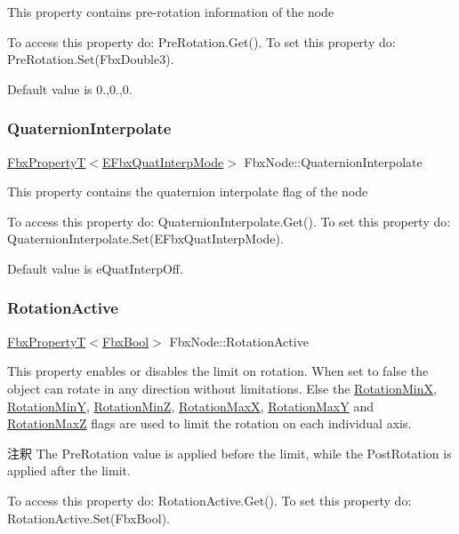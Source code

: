 This property contains pre-\/rotation information of the node

To access this property do\+: Pre\+Rotation.\+Get(). To set this property do\+: Pre\+Rotation.\+Set(\+Fbx\+Double3).

Default value is 0.,0.,0. \mbox{\label{class_fbx_node_aeeff96aed2eec641d422211a5d13a597}} 
\subsubsection{\texorpdfstring{Quaternion\+Interpolate}{QuaternionInterpolate}}
{\footnotesize\ttfamily \hyperlink{class_fbx_property_t}{Fbx\+PropertyT}$<$\hyperlink{fbxmath_8h_a9c7a0dfb52c83256d4a92c5c6d1be72a}{E\+Fbx\+Quat\+Interp\+Mode}$>$ Fbx\+Node\+::\+Quaternion\+Interpolate}

This property contains the quaternion interpolate flag of the node

To access this property do\+: Quaternion\+Interpolate.\+Get(). To set this property do\+: Quaternion\+Interpolate.\+Set(\+E\+Fbx\+Quat\+Interp\+Mode).

Default value is e\+Quat\+Interp\+Off. \mbox{\label{class_fbx_node_aaa4a7a57dc28f7979c04c096bd94b752}} 
\subsubsection{\texorpdfstring{Rotation\+Active}{RotationActive}}
{\footnotesize\ttfamily \hyperlink{class_fbx_property_t}{Fbx\+PropertyT}$<$\hyperlink{fbxtypes_8h_a92e0562b2fe33e76a242f498b362262e}{Fbx\+Bool}$>$ Fbx\+Node\+::\+Rotation\+Active}

This property enables or disables the limit on rotation. When set to {\ttfamily false} the object can rotate in any direction without limitations. Else the \hyperlink{class_fbx_node_a8b07f4e0bae14c76b79405c0f881a492}{Rotation\+MinX}, \hyperlink{class_fbx_node_aa1e032cbdaad4bac9ef9dbc6efe3fcea}{Rotation\+MinY}, \hyperlink{class_fbx_node_ab78b8c903c7104974ff2567dbc43f3cf}{Rotation\+MinZ}, \hyperlink{class_fbx_node_a727d3f12af78c3ae37e77b5d87c97f79}{Rotation\+MaxX}, \hyperlink{class_fbx_node_a4182202837129c1e05f5dba5b37cb8c6}{Rotation\+MaxY} and \hyperlink{class_fbx_node_a6d1242899fb510f5d5df4f3a1a7cf32c}{Rotation\+MaxZ} flags are used to limit the rotation on each individual axis. \begin{DoxyRemark}{注釈}
The Pre\+Rotation value is applied before the limit, while the Post\+Rotation is applied after the limit.
\end{DoxyRemark}
To access this property do\+: Rotation\+Active.\+Get(). To set this property do\+: Rotation\+Active.\+Set(\+Fbx\+Bool).


